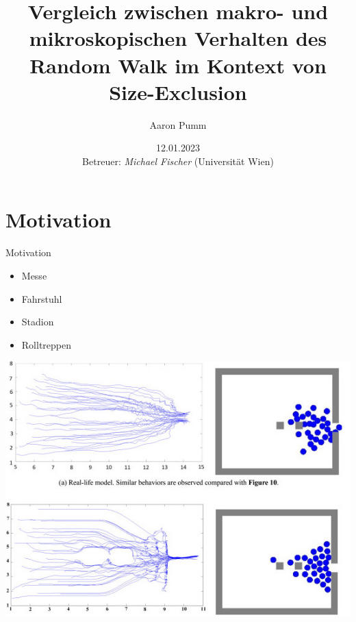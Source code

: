 \documentclass[xcolor=dvipsnames, aspectratio=169]{beamer}
\title{Vergleich zwischen makro- und mikroskopischen Verhalten des Random Walk im Kontext von Size-Exclusion}
\author{Aaron Pumm}
\institute{Universität Wien}
\date{12.01.2023 \\ \vspace{0.2in} \footnotesize{Betreuer: \textit{Michael Fischer} (Universität Wien)}}
\begin{document}
\nocite{*}

\begin{frame}[t]
	\titlepage
\end{frame}

\logo{}




\section{Motivation}

\begin{frame}{Motivation}
	\begin{minipage}{0.3\linewidth}
        \begin{itemize}
            \item Messe
            \item Fahrstuhl
            \item Stadion
            \item Rolltreppen
        \end{itemize}
    \end{minipage}
    \begin{minipage}{0.69\linewidth}
        \begin{center}
            \includegraphics[width=\linewidth]{figures/pedestrianMovement.jpg}
        \end{center}
        \cite*{song2018data}
    \end{minipage}
\end{frame}
\end{document}
